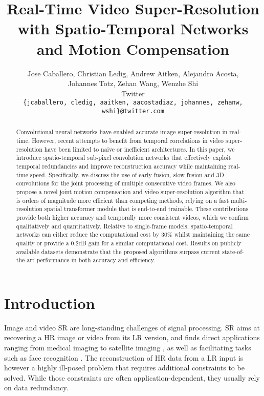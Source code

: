 \documentclass[10pt,twocolumn,letterpaper]{article}
\begin{document}
\title{Real-Time Video Super-Resolution with Spatio-Temporal Networks and Motion Compensation}



\author{Jose Caballero, Christian Ledig, Andrew Aitken, Alejandro Acosta,\\
Johannes Totz, Zehan Wang, Wenzhe Shi\\
Twitter \\
{\tt\small \{jcaballero, cledig, aaitken, aacostadiaz, johannes, zehanw, wshi\}@twitter.com}
}

\maketitle


\begin{abstract}
Convolutional neural networks have enabled accurate image super-resolution in real-time. However, recent attempts to benefit from temporal correlations in video super-resolution have been limited to naive or inefficient architectures. In this paper, we introduce spatio-temporal sub-pixel convolution networks that effectively exploit temporal redundancies and improve reconstruction accuracy while maintaining real-time speed. Specifically, we discuss the use of early fusion, slow fusion and 3D convolutions for the joint processing of multiple consecutive video frames. We also propose a novel joint motion compensation and video super-resolution algorithm that is orders of magnitude more efficient than competing methods, relying on a fast multi-resolution spatial transformer module that is end-to-end trainable. These contributions provide both higher accuracy and temporally more consistent videos, which we confirm qualitatively and quantitatively. Relative to single-frame models, spatio-temporal networks can either reduce the computational cost by 30\% whilst maintaining the same quality or provide a 0.2dB gain for a similar computational cost. Results on publicly available datasets demonstrate that the proposed algorithms surpass current state-of-the-art performance in both accuracy and efficiency.

\end{abstract}

\section{Introduction}

Image and video \gls{SR} are long-standing challenges of signal processing. \Gls{SR} aims at recovering a \gls{HR} image or video from its \gls{LR} version, and finds direct applications ranging from medical imaging \cite{Yang2012, Shi2013} to satellite imaging \cite{Karunakar2013}, as well as facilitating tasks such as face recognition \cite{Gunturk2003}. The reconstruction of \gls{HR} data from a \gls{LR} input is however a highly ill-posed problem that requires additional constraints to be solved. While those constraints are often application-dependent, they usually rely on data redundancy.
\end{document}
